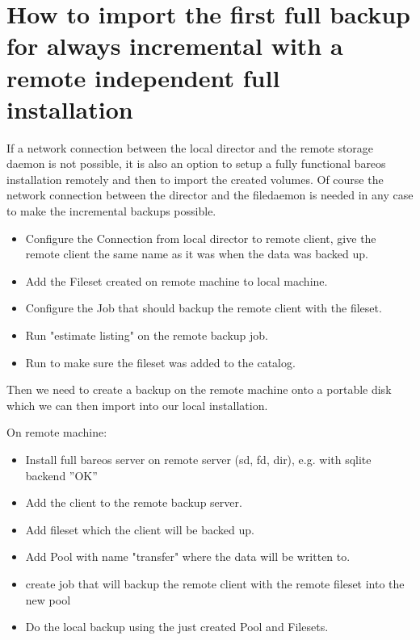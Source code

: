 \section{How to import the first full backup for always incremental with a remote independent full installation}

If a network connection between the local director and the remote storage daemon is not possible, it is also an option to setup a fully functional bareos installation remotely and then to import the created volumes.
Of course the network connection between the director and the filedaemon is needed in any case to make the incremental backups possible.



\begin{itemize}
    \item Configure the Connection from local director to remote client, give the remote client the same name as it was when the data was backed up.
    \item Add the Fileset created on remote machine to local machine.
    \item Configure the Job that should backup the remote client with the fileset.
    \item Run "estimate listing" on the remote backup job.
    \item Run  to make sure the fileset was added to the catalog.
\end{itemize}


Then we need to create a backup on the remote machine onto a portable disk which we can then import into our local installation.



On remote machine:

\begin{itemize}
    \item Install full bareos server on remote server (sd, fd, dir), e.g. with sqlite backend ''OK''
    \item Add the client to the remote backup server.
    \item Add fileset which the client will be backed up.
    \item Add Pool with name "transfer" where the data will be written to.
    \item create job that will backup the remote client with the remote fileset into the new pool
    \item Do the local backup using the just created Pool and Filesets.
\end{itemize}

